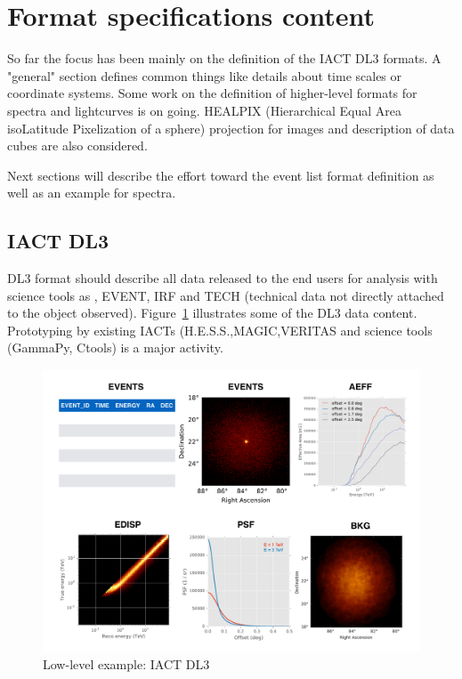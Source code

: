 \section{Format specifications content}

So far the focus has been mainly on the definition of the IACT DL3 formats.  A "general" section defines common things like details about time scales or coordinate systems. Some work on the definition of higher-level formats for spectra and lightcurves is on going. HEALPIX  (Hierarchical Equal Area isoLatitude Pixelization of a sphere) projection for images and  description of data cubes are also considered.

Next sections will describe the effort toward the event list format definition as well as an example for spectra.

\subsection{IACT DL3}

DL3 format should describe all data released to the end users for analysis with science tools as , EVENT, IRF and TECH (technical data not directly attached to the object observed). Figure~\ref{fig:iact-dl3} illustrates some of the DL3 data content. Prototyping by existing IACTs (H.E.S.S.,MAGIC,VERITAS and science tools (GammaPy, Ctools) is a major activity. 

\begin{figure}[tb]
  \centerline{\includegraphics[width=\textwidth]{figures/iact-dl3}}
  \caption{Low-level example: IACT DL3}
  \label{fig:iact-dl3}
\end{figure}

